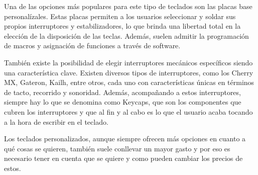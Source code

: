 Una de las opciones más populares para este tipo de teclados son las placas base personalízales. Estas placas permiten a los usuarios seleccionar y soldar sus propios interruptores y estabilizadores, lo que brinda una libertad total en la elección de la disposición de las teclas. Además, suelen admitir la programación de macros y asignación de funciones a través de software.

También existe la posibilidad de elegir interruptores mecánicos específicos siendo una característica clave. Existen diversos tipos de interruptores, como los Cherry MX, Gateron, Kailh, entre otros, cada uno con características únicas en términos de tacto, recorrido y sonoridad. Además, acompañando a estos interruptores, siempre hay lo que se denomina como \gls{Keycaps}, que son los componentes que cubren los interruptores y que al fin y al cabo es lo que el usuario acaba tocando a la hora de escribir en el teclado.

Los teclados personalizados, aunque siempre ofrecen más opciones en cuanto a qué cosas se quieren, también suele conllevar un mayor gasto y por eso es necesario tener en cuenta que se quiere y como pueden cambiar los precios de estos.


